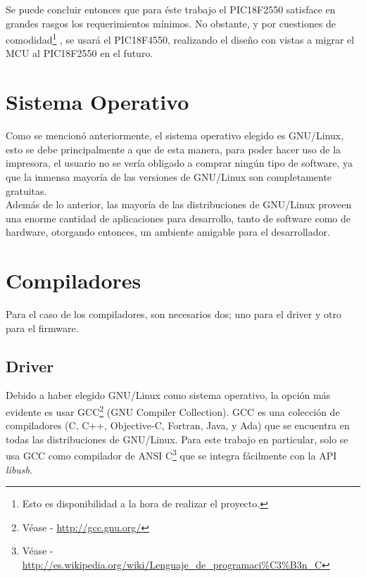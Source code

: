 Se puede concluir entonces que para \'este trabajo el PIC18F2550 satisface en
grandes rasgos los requerimientos m\'inimos. No obstante, y por cuestiones de
comodidad\footnote{Esto es disponibilidad a la hora de realizar el proyecto.}
, se usar\'a el PIC18F4550, realizando el dise\~no con vistas a migrar el MCU
al PIC18F2550 en el futuro.\\

\section{Sistema Operativo} %
Como se mencion\'o anteriormente, el sistema operativo elegido es GNU/Linux,
esto se debe principalmente a que de esta manera, para poder hacer uso de la
impresora, el usuario no se ver\'ia obligado a comprar ning\'un tipo de
software, ya que la inmensa mayor\'ia de las versiones de GNU/Linux son
completamente
gratuitas.\\

Adem\'as de lo anterior, las mayor\'ia de las distribuciones de GNU/Linux
proveen una enorme cantidad de aplicaciones para desarrollo, tanto de software
como de hardware, otorgando entonces, un ambiente amigable para el
desarrollador.\\

\section{Compiladores} %
Para el caso de los compiladores, son necesarios dos; uno para el driver y
otro para el firmware.\\

\subsection{Driver}
Debido a haber elegido GNU/Linux como sistema operativo, la opci\'on m\'as
evidente es usar GCC\footnote{V\'ease - \url{http://gcc.gnu.org/}} (GNU
Compiler Collection). GCC es una colecci\'on de compiladores (C, C++,
Objective-C, Fortran, Java, y Ada) que se encuentra en todas las distribuciones
de GNU/Linux. Para este trabajo en particular, solo se usa GCC como compilador
de ANSI C\footnote{V\'ease -
\url{http://es.wikipedia.org/wiki/Lenguaje_de_programaci\%C3\%B3n_C}} que se
integra f\'acilmente con la API \emph{libusb}.

